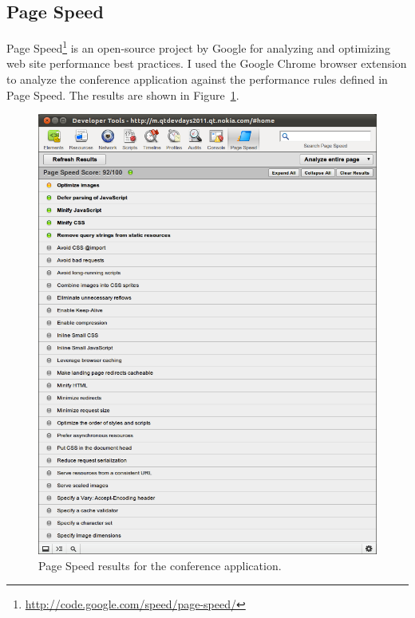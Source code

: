 \subsection{Page Speed}

Page Speed\footnote{\url{http://code.google.com/speed/page-speed/}} is
an open-source project by Google for analyzing and optimizing web site
performance best practices. I used the Google Chrome browser extension
to analyze the conference application against the performance rules
defined in Page Speed. The results are shown in
Figure~\ref{figure:devdays-pagespeed.png}.

\begin{figure}[h!]
  \begin{center}
    \includegraphics[width=\textwidth]{images/devdays-pagespeed.png}
    \caption{Page Speed results for the conference application.}
    \label{figure:devdays-pagespeed.png}
  \end{center}
\end{figure}

